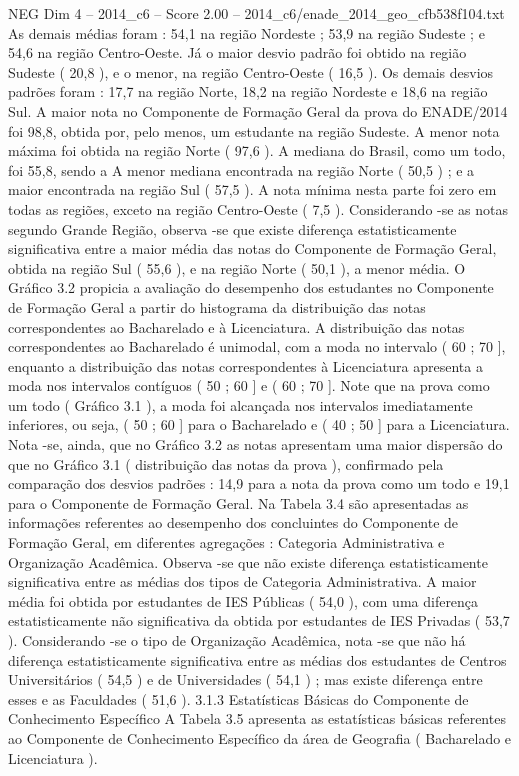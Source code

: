 \begin{textsample}{NEG Dim 4 – 2014\_c6 – Score 2.00 – 2014\_c6/enade\_2014\_geo\_cfb538f104.txt}
As demais médias foram : 54,1 na região Nordeste ; 53,9 na região Sudeste ; e 54,6 na região Centro-Oeste.
Já o maior desvio padrão foi obtido na região Sudeste ( 20,8 ), e o menor, na região Centro-Oeste ( 16,5 ).
Os demais desvios padrões foram : 17,7 na região Norte, 18,2 na região Nordeste e 18,6 na região Sul.
A maior nota no Componente de Formação Geral da prova do ENADE/2014 foi 98,8, obtida por, pelo menos, um estudante na região Sudeste.
A menor nota máxima foi obtida na região Norte ( 97,6 ).
A mediana do Brasil, como um todo, foi 55,8, sendo a A menor mediana encontrada na região Norte ( 50,5 ) ; e a maior encontrada na região Sul ( 57,5 ).
A nota mínima nesta parte foi zero em todas as regiões, exceto na região Centro-Oeste ( 7,5 ).
Considerando -se as notas segundo Grande Região, observa -se que existe diferença estatisticamente significativa entre a maior média das notas do Componente de Formação Geral, obtida na região Sul ( 55,6 ), e na região Norte ( 50,1 ), a menor média.
O Gráfico 3.2 propicia a avaliação do desempenho dos estudantes no Componente de Formação Geral a partir do histograma da distribuição das notas correspondentes ao Bacharelado e à Licenciatura.
A distribuição das notas correspondentes ao Bacharelado é unimodal, com a moda no intervalo ( 60 ; 70 ], enquanto a distribuição das notas correspondentes à Licenciatura apresenta a moda nos intervalos contíguos ( 50 ; 60 ] e ( 60 ; 70 ].
Note que na prova como um todo ( Gráfico 3.1 ), a moda foi alcançada nos intervalos imediatamente inferiores, ou seja, ( 50 ; 60 ] para o Bacharelado e ( 40 ; 50 ] para a Licenciatura.
Nota -se, ainda, que no Gráfico 3.2 as notas apresentam uma maior dispersão do que no Gráfico 3.1 ( distribuição das notas da prova ), confirmado pela comparação dos desvios padrões : 14,9 para a nota da prova como um todo e 19,1 para o Componente de Formação Geral.
Na Tabela 3.4 são apresentadas as informações referentes ao desempenho dos concluintes do Componente de Formação Geral, em diferentes agregações : Categoria Administrativa e Organização Acadêmica.
Observa -se que não existe diferença estatisticamente significativa entre as médias dos tipos de Categoria Administrativa.
A maior média foi obtida por estudantes de IES Públicas ( 54,0 ), com uma diferença estatisticamente não significativa da obtida por estudantes de IES Privadas ( 53,7 ).
Considerando -se o tipo de Organização Acadêmica, nota -se que não há diferença estatisticamente significativa entre as médias dos estudantes de Centros Universitários ( 54,5 ) e de Universidades ( 54,1 ) ; mas existe diferença entre esses e as Faculdades ( 51,6 ). 3.1.3 Estatísticas Básicas do Componente de Conhecimento Específico A Tabela 3.5 apresenta as estatísticas básicas referentes ao Componente de Conhecimento Específico da área de Geografia ( Bacharelado e Licenciatura ).

\end{textsample}
